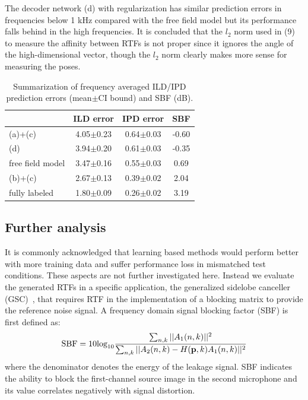 \documentclass{article}
\begin{document}
The decoder network (d) with regularization has similar prediction errors in frequencies below 1 kHz compared with the free field model but its performance falls behind in the high frequencies. It is concluded that the $l_2$ norm used in (9) to measure the affinity between RTFs is not proper since it ignores the angle of the high-dimensional vector, though the $l_2$ norm clearly makes more sense for measuring the poses.

\begin{table}[tb]
\caption{Summarization of frequency averaged ILD/IPD prediction errors (mean$\pm$CI bound) and SBF (dB).}
\label{table:1}
\begin{center}
\begin{tabular}{|l|c|c||c|}
  \hline
                       & ILD error & IPD error & SBF \\ \hline
   (a)+(c)    & 4.05$\pm$0.23 & 0.64$\pm$0.03  &  -0.60\\ \hline
   (d)        & 3.94$\pm$0.20 & 0.61$\pm$0.03   &  -0.35\\ \hline
   free field model & 3.47$\pm$0.16 & 0.55$\pm$0.03 & 0.69\\ \hline
   (b)+(c)    & 2.67$\pm$0.13 & 0.39$\pm$0.02    &  2.04   \\ \hline
   fully labeled & 1.80$\pm$0.09 & 0.26$\pm$0.02 &  3.19 \\ \hline
\end{tabular}
\end{center}
\end{table}



\subsection{Further analysis}

It is commonly acknowledged that learning based methods would perform better with more training data and suffer performance loss in mismatched test conditions. These aspects are not further investigated here. Instead we evaluate the generated RTFs in a specific application, the generalized sidelobe canceller (GSC)~\cite{gannot2001signal}, that requires RTF in the implementation of a blocking matrix to provide the reference noise signal. A frequency domain signal blocking factor (SBF) is first defined as:
\begin{equation}\label{eq:sbf}
  \text{SBF}=10\text{log}_{10}\frac{\sum_{n,k} ||A_1(n,k)||^2}{\sum_{n,k} ||A_2(n,k)-H({\bf p},k)A_1(n,k)||^2}
\end{equation}
where the denominator denotes the energy of the leakage signal. SBF indicates the ability to block the first-channel source image in the second microphone and its value correlates negatively with signal distortion.
\end{document}
